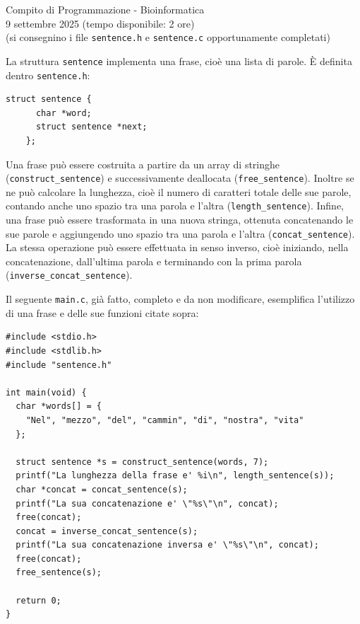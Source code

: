 \documentclass[12pt]{article}
\begin{document}
\begin{center}
  {\LARGE Compito di Programmazione - Bioinformatica}\\
  {9 settembre 2025 (tempo disponibile: 2 ore)}\\
  {(si consegnino i file \texttt{sentence.h} e \texttt{sentence.c} opportunamente completati)}
\end{center}

La struttura \texttt{sentence} implementa una frase, cio\`e una lista di parole. \`E definita
dentro \texttt{sentence.h}:

\begin{center}
  \begin{lstlisting}[language=myC]
    struct sentence {
      char *word;
      struct sentence *next;
    };
  \end{lstlisting}
\end{center}

Una frase pu\`o essere costruita a partire da un array di stringhe
(\texttt{construct\_sentence})
e successivamente deallocata (\texttt{free\_sentence}).
Inoltre se ne pu\`o calcolare la lunghezza, cio\`e il numero di caratteri
totale delle sue parole, contando anche uno spazio tra una parola
e l'altra (\texttt{length\_sentence}). Infine, una
frase pu\`o essere trasformata in una nuova stringa,
ottenuta concatenando le sue parole e aggiungendo uno spazio tra una parola
e l'altra (\texttt{concat\_sentence}). La stessa operazione pu\`o essere
effettuata in senso inverso, cio\`e iniziando, nella concatenazione,
dall'ultima parola e terminando con la prima parola (\texttt{inverse\_concat\_sentence}).

Il seguente \texttt{main.c}, gi\`a fatto, completo e da non modificare, esemplifica
l'utilizzo di una frase e delle sue funzioni citate sopra:

\begin{mdframed}[backgroundcolor=verylightgray]
  \begin{lstlisting}[language=myC]
#include <stdio.h>
#include <stdlib.h>
#include "sentence.h"

int main(void) {
  char *words[] = {
    "Nel", "mezzo", "del", "cammin", "di", "nostra", "vita"
  };

  struct sentence *s = construct_sentence(words, 7);
  printf("La lunghezza della frase e' %i\n", length_sentence(s));
  char *concat = concat_sentence(s);
  printf("La sua concatenazione e' \"%s\"\n", concat);
  free(concat);
  concat = inverse_concat_sentence(s);
  printf("La sua concatenazione inversa e' \"%s\"\n", concat);
  free(concat);
  free_sentence(s);

  return 0;
}
  \end{lstlisting}
\end{mdframed}
\end{document}
